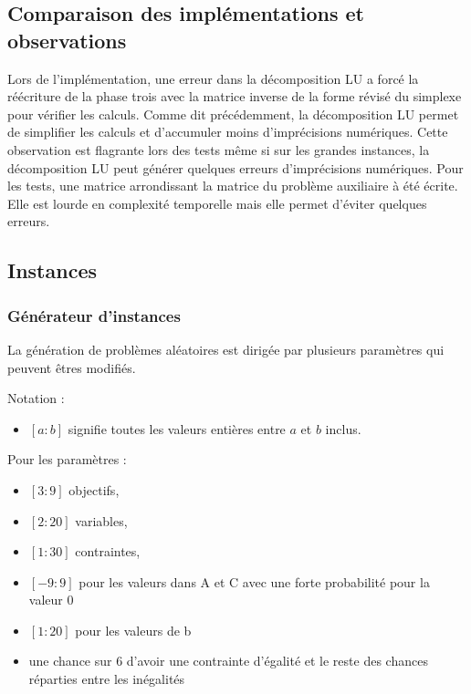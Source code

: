 \documentclass[a4paper,10pt]{article}
\theoremstyle{plain}
\begin{document}
\subsection{Comparaison des implémentations et observations}
Lors de l'implémentation, une erreur dans la décomposition LU a forcé la réécriture de la phase trois avec la matrice inverse de la forme révisé du simplexe pour vérifier les calculs. Comme dit précédemment, la décomposition LU permet de simplifier les calculs et d'accumuler moins d'imprécisions numériques. Cette observation est flagrante lors des tests même si sur les grandes instances, la décomposition LU peut générer quelques erreurs d'imprécisions numériques.
Pour les tests, une matrice arrondissant la matrice du problème auxiliaire à été écrite. Elle est lourde en complexité temporelle mais elle permet d'éviter quelques erreurs.\\

\subsection{Instances}
\subsubsection{Générateur d'instances}
La génération de problèmes aléatoires est dirigée par plusieurs paramètres qui peuvent êtres modifiés.

Notation :
\begin{itemize}
\item $[a:b]$ signifie toutes les valeurs entières entre $a$ et $b$ inclus.
\end{itemize}

Pour les paramètres :
\begin{itemize}
\item $[3:9]$ objectifs,
\item $[2:20]$ variables,
\item $[1:30]$ contraintes,
\item $[-9:9]$ pour les valeurs dans A et C avec une forte probabilité pour la valeur 0
\item $[1:20]$ pour les valeurs de b
\item une chance sur 6 d'avoir une contrainte d'égalité et le reste des chances réparties entre les inégalités
\end{itemize}
\end{document}
